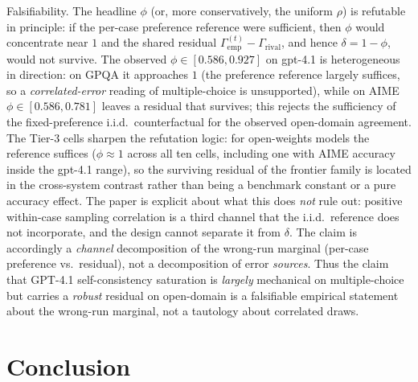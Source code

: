 \documentclass[a4paper,fleqn]{cas-sc}
\newcommand{\agreementIndex}{\Gamma}
\begin{document}
Falsifiability. The headline $\phi$ (or, more conservatively, the
uniform $\rho$) is refutable in principle: if the per-case preference
reference were sufficient, then $\phi$ would concentrate near $1$ and the shared
residual $\agreementIndex_{\mathrm{emp}}^{(t)}-\agreementIndex_{\mathrm{rival}}$, and hence
$\delta=1-\phi$, would not survive. The observed
$\phi\in[0.586,0.927]$ on gpt-4.1 is heterogeneous in direction: on GPQA it
approaches
$1$ (the preference reference largely suffices, so a \emph{correlated-error}
reading of multiple-choice is unsupported), while on AIME
$\phi\in[0.586,0.781]$
leaves a residual that survives; this rejects the sufficiency of the
fixed-preference i.i.d.\ counterfactual for the observed open-domain
agreement. The Tier-3 cells sharpen
the refutation logic: for open-weights models the reference suffices
($\phi\approx1$ across all ten cells, including one with AIME accuracy
inside the gpt-4.1 range), so the surviving residual of the frontier
family is located in the cross-system contrast rather than being a benchmark
constant or a pure accuracy effect. The paper is explicit about what this does \emph{not} rule out: positive within-case sampling
correlation is a third channel that the i.i.d.\ reference does not
incorporate, and the design cannot separate it from $\delta$. The claim
is accordingly a \emph{channel} decomposition of the wrong-run marginal
(per-case preference vs.\ residual), not a decomposition of error
\emph{sources}. Thus the claim that GPT-4.1 self-consistency
saturation is \emph{largely} mechanical on multiple-choice but carries a
\emph{robust} residual on open-domain is a falsifiable
empirical statement about the wrong-run marginal, not a tautology about
correlated draws.

\section{Conclusion}
\end{document}
